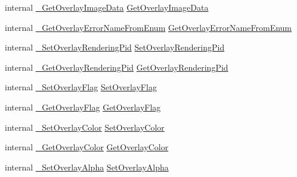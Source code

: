 \begin{DoxyCompactItemize}
internal \mbox{\hyperlink{struct_valve_1_1_v_r_1_1_i_v_r_overlay_a871e10fd2136e1cfe17cab1e20aa3832}{\+\_\+\+Get\+Overlay\+Image\+Data}} \mbox{\hyperlink{struct_valve_1_1_v_r_1_1_i_v_r_overlay_a476c7e7a6f2fc65d37cb3be7e7901235}{Get\+Overlay\+Image\+Data}}
\item 
internal \mbox{\hyperlink{struct_valve_1_1_v_r_1_1_i_v_r_overlay_a55f8c3483bb8a333ac58781e174bde62}{\+\_\+\+Get\+Overlay\+Error\+Name\+From\+Enum}} \mbox{\hyperlink{struct_valve_1_1_v_r_1_1_i_v_r_overlay_a5e0488d484a36ac72d2c82138db9c89f}{Get\+Overlay\+Error\+Name\+From\+Enum}}
\item 
internal \mbox{\hyperlink{struct_valve_1_1_v_r_1_1_i_v_r_overlay_a8f638ca89f20888242e2232fd3e0c0e2}{\+\_\+\+Set\+Overlay\+Rendering\+Pid}} \mbox{\hyperlink{struct_valve_1_1_v_r_1_1_i_v_r_overlay_a2a49855e3082c6daab777189a5644cbe}{Set\+Overlay\+Rendering\+Pid}}
\item 
internal \mbox{\hyperlink{struct_valve_1_1_v_r_1_1_i_v_r_overlay_a3d5ff014664a9f79caa2c148682a6d30}{\+\_\+\+Get\+Overlay\+Rendering\+Pid}} \mbox{\hyperlink{struct_valve_1_1_v_r_1_1_i_v_r_overlay_a5b1fc4a6cfeb762431eed8c71165f952}{Get\+Overlay\+Rendering\+Pid}}
\item 
internal \mbox{\hyperlink{struct_valve_1_1_v_r_1_1_i_v_r_overlay_a4640d4e761c851e4673dbabf21915b14}{\+\_\+\+Set\+Overlay\+Flag}} \mbox{\hyperlink{struct_valve_1_1_v_r_1_1_i_v_r_overlay_a203cf261dd56441b5692df6f3310410f}{Set\+Overlay\+Flag}}
\item 
internal \mbox{\hyperlink{struct_valve_1_1_v_r_1_1_i_v_r_overlay_ae8d49da4f9a47a988edc9492f9e92831}{\+\_\+\+Get\+Overlay\+Flag}} \mbox{\hyperlink{struct_valve_1_1_v_r_1_1_i_v_r_overlay_a47b9e31a190c45785a89354955fb2ebe}{Get\+Overlay\+Flag}}
\item 
internal \mbox{\hyperlink{struct_valve_1_1_v_r_1_1_i_v_r_overlay_ae4f9f357c73e29c9b4e88c6f8070df8e}{\+\_\+\+Set\+Overlay\+Color}} \mbox{\hyperlink{struct_valve_1_1_v_r_1_1_i_v_r_overlay_a14c3daebf2bf8299287333a5eebec8a3}{Set\+Overlay\+Color}}
\item 
internal \mbox{\hyperlink{struct_valve_1_1_v_r_1_1_i_v_r_overlay_a8a389fa30b6c03914919dca699444cdd}{\+\_\+\+Get\+Overlay\+Color}} \mbox{\hyperlink{struct_valve_1_1_v_r_1_1_i_v_r_overlay_ae2b6ac0167c173fd45f73b00ee14d030}{Get\+Overlay\+Color}}
\item 
internal \mbox{\hyperlink{struct_valve_1_1_v_r_1_1_i_v_r_overlay_a5bdec940e24ef87b9e12c5e9f91862f0}{\+\_\+\+Set\+Overlay\+Alpha}} \mbox{\hyperlink{struct_valve_1_1_v_r_1_1_i_v_r_overlay_a28263fb51de67daac38fdb2384f8e9bd}{Set\+Overlay\+Alpha}}

\end{DoxyCompactItemize}
